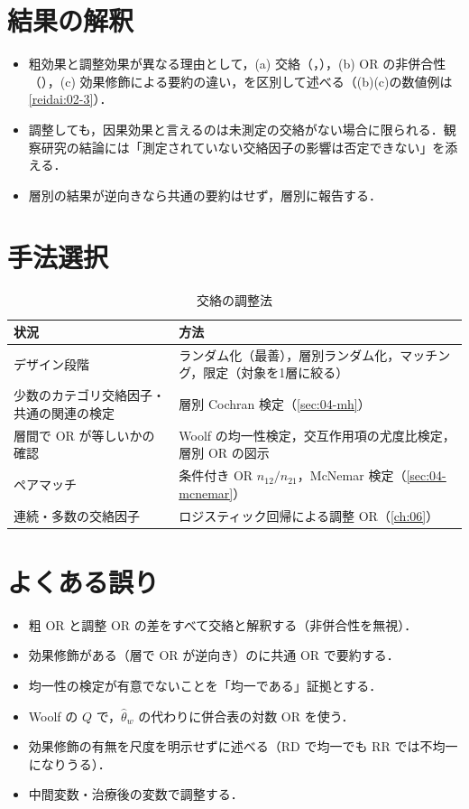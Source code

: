 \section{結果の解釈}\label{sec:07-interp}
\begin{itemize}
\item 粗効果と調整効果が異なる理由として，(a) 交絡（，），(b) OR の非併合性（），(c) 効果修飾による要約の違い，を区別して述べる（(b)(c)の数値例は\cref{reidai:02-3}）．
\item 調整しても，因果効果と言えるのは未測定の交絡がない場合に限られる．観察研究の結論には「測定されていない交絡因子の影響は否定できない」を添える．
\item 層別の結果が逆向きなら共通の要約はせず，層別に報告する．
\end{itemize}

\section{手法選択}\label{sec:07-choice}
\begin{table}[htbp]
\centering\small
\caption{交絡の調整法}\label{tab:07-choice}
\begin{tabular}{@{}L{48mm}L{87mm}@{}}
\toprule
状況 & 方法\\
\midrule
デザイン段階 & ランダム化（最善），層別ランダム化，マッチング，限定（対象を1層に絞る）\\
少数のカテゴリ交絡因子・共通の関連の検定 & 層別 Cochran 検定（\cref{sec:04-mh}）\\
層間で OR が等しいかの確認 & Woolf の均一性検定，交互作用項の尤度比検定，層別 OR の図示\\
ペアマッチ & 条件付き OR $n_{12}/n_{21}$，McNemar 検定（\cref{sec:04-mcnemar}）\\
連続・多数の交絡因子 & ロジスティック回帰による調整 OR（\cref{ch:06}）\\
\bottomrule
\end{tabular}
\end{table}

\section{よくある誤り}\label{sec:07-err}
\begin{warnbox}
\begin{itemize}
\item 粗 OR と調整 OR の差をすべて交絡と解釈する（非併合性を無視）．
\item 効果修飾がある（層で OR が逆向き）のに共通 OR で要約する．
\item 均一性の検定が有意でないことを「均一である」証拠とする．
\item Woolf の $Q$ で，$\hat\theta_w$ の代わりに併合表の対数 OR を使う．
\item 効果修飾の有無を尺度を明示せずに述べる（RD で均一でも RR では不均一になりうる）．
\item 中間変数・治療後の変数で調整する．
\end{itemize}
\end{warnbox}

